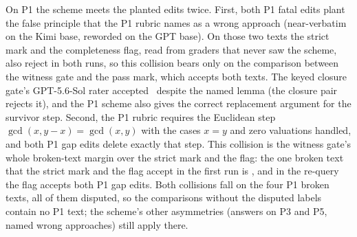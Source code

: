 On P1 the scheme meets the planted edits twice. First, both P1 fatal edits plant the false principle that the P1 rubric names as a wrong approach (near-verbatim on the Kimi base, reworded on the GPT base). On those two texts the strict mark and the completeness flag, read from graders that never saw the scheme, also reject in both runs, so this collision bears only on the comparison between the witness gate and the pass mark, which accepts both texts. The keyed closure gate's GPT-5.6-Sol rater accepted \CRIdKimiPoneF\ despite the named lemma (the closure pair rejects it), and the P1 scheme also gives the correct replacement argument for the survivor step. Second, the P1 rubric requires the Euclidean step $\gcd(x, y-x) = \gcd(x, y)$ with the cases $x=y$ and zero valuations handled, and both P1 gap edits delete exactly that step. This collision is the witness gate's whole broken-text margin over the strict mark and the flag: the one broken text that the strict mark and the flag accept in the first run is \CRIdGptPoneG, and in the re-query the flag accepts both P1 gap edits. Both collisions fall on the four P1 broken texts, all of them disputed, so the comparisons without the disputed labels contain no P1 text; the scheme's other asymmetries (answers on P3 and P5, named wrong approaches) still apply there.

\begin{table}[htbp]
  \caption{What each arm's system prompt contains, per problem (stored \texttt{request.json}; identical across graders and texts of a problem). Characters: system-prompt length. Answer given: ``value of $M$'' and ``form of $L$'' are given in the field mappings of P1 and P6. Solution ban: the grade prompt's ``Do not consult, recall, or compare against any published solution, and do not use a fixed list of required lemmas''.}
  \label{tab:planted-arms}
  \centering
  \CRfit{}
\end{table}

